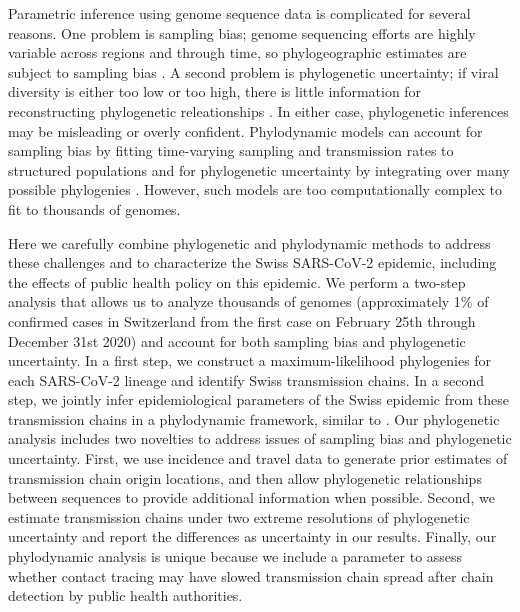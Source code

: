 \documentclass[9pt,twocolumn,twoside,lineno]{pnas-new}
\begin{document}
Parametric inference using genome sequence data is complicated for several reasons. One problem is sampling bias; genome sequencing efforts are highly variable across regions and through time, so phylogeographic estimates are subject to sampling bias \cite{Villabona-Arenas2020, DeMaio2015}. A second problem is phylogenetic uncertainty; if viral diversity is either too low or too high, there is little information for reconstructing phylogenetic releationships  \cite{Villabona-Arenas2020}. In either case, phylogenetic inferences may be misleading or overly confident. Phylodynamic models can account for sampling bias by fitting  time-varying sampling and transmission rates to structured populations and for phylogenetic uncertainty by integrating over many possible phylogenies \cite{Scire2020b}. However, such models are too computationally complex to fit to thousands of genomes. 

Here we carefully combine phylogenetic and phylodynamic methods to address these challenges and to characterize the Swiss SARS-CoV-2 epidemic, including the effects of public health policy on this epidemic. We perform a two-step analysis that allows us to analyze thousands of genomes (approximately 1\% of confirmed cases in Switzerland from the first case on February 25th through December 31st 2020) and account for both sampling bias and phylogenetic uncertainty. In a first step, we construct a maximum-likelihood phylogenies for each SARS-CoV-2 lineage and identify Swiss transmission chains. In a second step, we jointly infer epidemiological parameters of the Swiss epidemic from these transmission chains in a phylodynamic framework, similar to \cite{Muller2020, Muller2020a}. Our phylogenetic analysis includes two novelties to address issues of sampling bias and phylogenetic uncertainty. First, we use incidence and travel data to generate prior estimates of transmission chain origin locations, and then allow phylogenetic relationships between sequences to provide additional information when possible. 
Second, we estimate transmission chains under two extreme resolutions of phylogenetic uncertainty and report the differences as uncertainty in our results. Finally, our phylodynamic analysis is unique  because we include a parameter to assess whether contact tracing may have slowed transmission chain spread after chain detection by public health authorities. 
\end{document}
